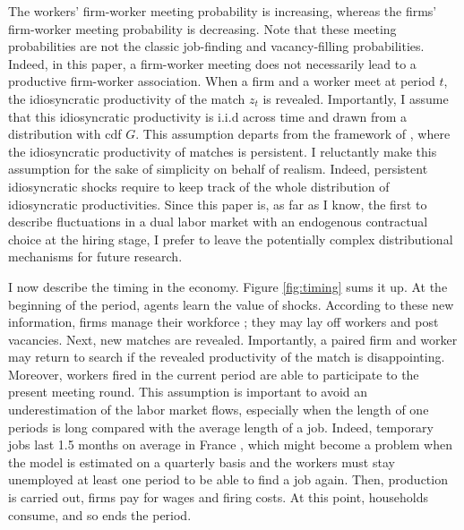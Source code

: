 The workers' firm-worker meeting probability is increasing, whereas the firms' firm-worker meeting probability is decreasing. Note that these meeting probabilities are not the classic job-finding and vacancy-filling probabilities. Indeed, in this paper, a firm-worker meeting does not necessarily lead to a productive firm-worker association. When a firm and a worker meet at period $t$, the idiosyncratic productivity of the match $z_t$ is revealed. Importantly, I assume that this idiosyncratic productivity is i.i.d across time and drawn from a distribution with cdf $G$. This assumption departs from the framework of \citet{rion:halshs-02331887}, where the idiosyncratic productivity of matches is persistent. I reluctantly make this assumption for the sake of simplicity on behalf of realism. Indeed, persistent idiosyncratic shocks require to keep track of the whole distribution of idiosyncratic productivities. Since this paper is, as far as I know, the first to describe fluctuations in a dual labor market with an endogenous contractual choice at the hiring stage, I prefer to leave the potentially complex distributional mechanisms for future research.

I now describe the timing in the economy. Figure \ref{fig:timing} sums it up. At the beginning of the period, agents learn the value of shocks. According to these new information, firms manage their workforce ; they may lay off workers and post vacancies. Next, new matches are revealed. Importantly, a paired firm and worker may return to search if the revealed productivity of the match is disappointing. Moreover, workers fired in the current period are able to participate to the present meeting round. This assumption is important to avoid an underestimation of the labor market flows, especially when the length of one periods is long compared  with the average length of a job. Indeed, temporary jobs last 1.5 months on average in France \citep{dares062018}, which might become a problem when the model is estimated on a quarterly basis and the workers must stay unemployed at least one period to be able to find a job again. Then, production is carried out, firms pay for wages and firing costs. At this point, households consume, and so ends the period. 

